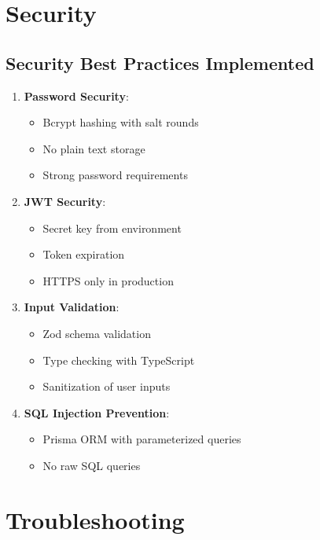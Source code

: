 \documentclass[12pt,a4paper]{article}
\begin{document}
\section{Security}

\subsection{Security Best Practices Implemented}

\begin{enumerate}
    \item \textbf{Password Security}:
    \begin{itemize}
        \item Bcrypt hashing with salt rounds
        \item No plain text storage
        \item Strong password requirements
    \end{itemize}

    \item \textbf{JWT Security}:
    \begin{itemize}
        \item Secret key from environment
        \item Token expiration
        \item HTTPS only in production
    \end{itemize}

    \item \textbf{Input Validation}:
    \begin{itemize}
        \item Zod schema validation
        \item Type checking with TypeScript
        \item Sanitization of user inputs
    \end{itemize}

    \item \textbf{SQL Injection Prevention}:
    \begin{itemize}
        \item Prisma ORM with parameterized queries
        \item No raw SQL queries
    \end{itemize}
\end{enumerate}

\section{Troubleshooting}
\end{document}
